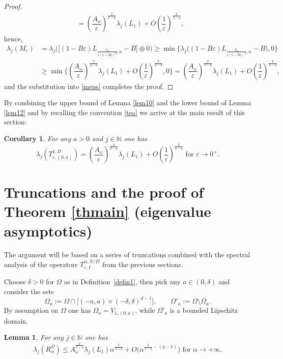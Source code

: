 \documentclass[11pt,oneside,reqno,a4paper]{amsart}
\newcommand{\N}{\mathbb{N}}
\newcommand{\eps}{\varepsilon}
\newtheorem{lemma}[theorem]{Lemma}
\newtheorem{corollary}[theorem]{Corollary}
\theoremstyle{definition}
\begin{document}
\begin{proof}
\begin{align*}
	&=\left(\dfrac{A_\omega}{\eps}\right)^{\frac{2}{2-q}}\lambda_j(L_1)+O\left(\dfrac{1}{\eps}\right)^{\frac{q}{2-q}},
\end{align*}
hence,
\begin{align*}
\lambda_j(M_\eps)&=\lambda_j\bigg(\Big[(1-B\eps)L_{\frac{A_\omega}{\eps (1-B\eps)^2},a}-B\Big]\oplus 0\bigg)
\ge \min\bigg\{ \lambda_j\Big((1-B\eps)L_{\frac{A_\omega}{\eps (1-B\eps)^2},a}-B\Big),0\bigg\}\\
&\ge \min\bigg\{ \left(\dfrac{A_\omega}{\eps}\right)^{\frac{2}{2-q}}\lambda_j(L_1)+O\left(\dfrac{1}{\eps}\right)^{\frac{q}{2-q}},0\bigg\}
=\left(\dfrac{A_\omega}{\eps}\right)^{\frac{2}{2-q}}\lambda_j(L_1)+O\left(\dfrac{1}{\eps}\right)^{\frac{q}{2-q}},
\end{align*}
and the substitution into \eqref{meps} completes the proof.
\end{proof}

By combining the upper bound of Lemma \ref{lem10} and the lower bound of Lemma \ref{lem12}
and by recalling the convention \eqref{tea} we arrive
at the main result of this section:

\begin{corollary}\label{corol14}
	For any $a>0$ and $j\in\N$ one has
	\[
	\lambda_j(T^{1,D}_{\eps,(0,a)})= \left(\dfrac{A_\omega}{\eps}\right)^{\frac{2}{2-q}}\lambda_j(L_1)+O\left(\dfrac{1}{\eps}\right)^{\frac{q}{2-q}} \text{ for }\eps\to 0^+.
	\]		
\end{corollary}


	
	\section{Truncations and the proof of Theorem \ref{thmain} (eigenvalue asymptotics)}\label{secproof}
	
The argument will be based on a series of truncations
combined with the spectral analysis of the operators $T^{\alpha,N/D}_{\eps,I}$ from the previous sections.
	
Choose $\delta>0$ for $\Omega$ as in Definition~\ref{defin1}, then pick any $a\in(0,\delta)$ and consider the sets
\[
\Omega_a:=\Omega\cap\Big[(-a,a)\times (-\delta,\delta)^{d-1}\Big],
\qquad
\Omega'_a:=\Omega\setminus\overline{\Omega_a}.
\]
By assumption on $\Omega$ one has $\Omega_a=V_{1,(0,a)}$,
while $\Omega'_a$ is a bounded Lipschitz domain.
	

\begin{lemma}\label{lem15}	For any $j\in\N$ one has
	\[
		\lambda_j(R^\Omega_\alpha)\le A_\omega^\frac{2}{2-q} \lambda_j(L_1) \alpha^\frac{2}{2-q}+O\Big(\alpha^{\frac{2}{2-q}-(q-1)}\Big) \text{ for $\alpha\to +\infty$.}
	\]	
\end{lemma}
\end{document}
